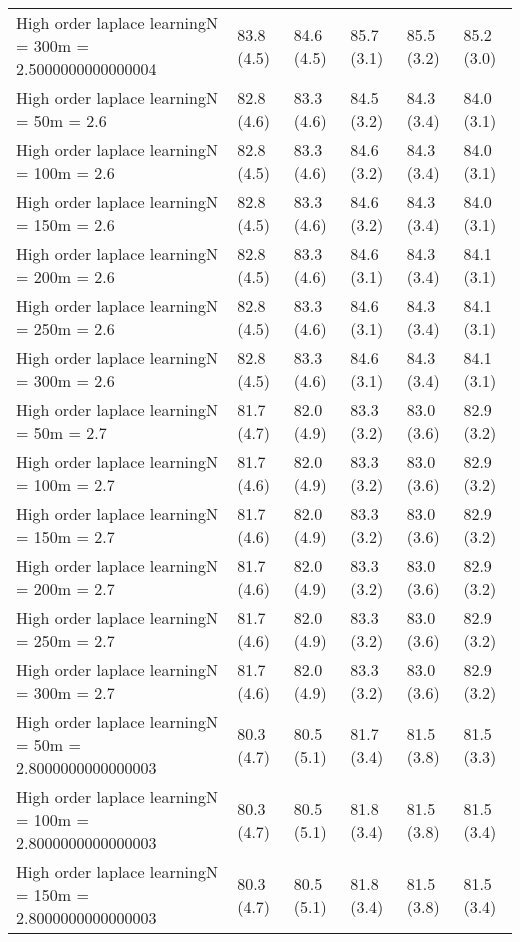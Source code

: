 \documentclass{article}
\begin{document}
\begin{table*}[t!]
\begin{center}
\begin{small}
\begin{sc}
\begin{tabular}{llllll}
High order laplace learningN = 300m = 2.5000000000000004&83.8 (4.5)      &84.6 (4.5)      &85.7 (3.1)      &85.5 (3.2)      &85.2 (3.0)      \\
High order laplace learningN = 50m = 2.6&82.8 (4.6)      &83.3 (4.6)      &84.5 (3.2)      &84.3 (3.4)      &84.0 (3.1)      \\
High order laplace learningN = 100m = 2.6&82.8 (4.5)      &83.3 (4.6)      &84.6 (3.2)      &84.3 (3.4)      &84.0 (3.1)      \\
High order laplace learningN = 150m = 2.6&82.8 (4.5)      &83.3 (4.6)      &84.6 (3.2)      &84.3 (3.4)      &84.0 (3.1)      \\
High order laplace learningN = 200m = 2.6&82.8 (4.5)      &83.3 (4.6)      &84.6 (3.1)      &84.3 (3.4)      &84.1 (3.1)      \\
High order laplace learningN = 250m = 2.6&82.8 (4.5)      &83.3 (4.6)      &84.6 (3.1)      &84.3 (3.4)      &84.1 (3.1)      \\
High order laplace learningN = 300m = 2.6&82.8 (4.5)      &83.3 (4.6)      &84.6 (3.1)      &84.3 (3.4)      &84.1 (3.1)      \\
High order laplace learningN = 50m = 2.7&81.7 (4.7)      &82.0 (4.9)      &83.3 (3.2)      &83.0 (3.6)      &82.9 (3.2)      \\
High order laplace learningN = 100m = 2.7&81.7 (4.6)      &82.0 (4.9)      &83.3 (3.2)      &83.0 (3.6)      &82.9 (3.2)      \\
High order laplace learningN = 150m = 2.7&81.7 (4.6)      &82.0 (4.9)      &83.3 (3.2)      &83.0 (3.6)      &82.9 (3.2)      \\
High order laplace learningN = 200m = 2.7&81.7 (4.6)      &82.0 (4.9)      &83.3 (3.2)      &83.0 (3.6)      &82.9 (3.2)      \\
High order laplace learningN = 250m = 2.7&81.7 (4.6)      &82.0 (4.9)      &83.3 (3.2)      &83.0 (3.6)      &82.9 (3.2)      \\
High order laplace learningN = 300m = 2.7&81.7 (4.6)      &82.0 (4.9)      &83.3 (3.2)      &83.0 (3.6)      &82.9 (3.2)      \\
High order laplace learningN = 50m = 2.8000000000000003&80.3 (4.7)      &80.5 (5.1)      &81.7 (3.4)      &81.5 (3.8)      &81.5 (3.3)      \\
High order laplace learningN = 100m = 2.8000000000000003&80.3 (4.7)      &80.5 (5.1)      &81.8 (3.4)      &81.5 (3.8)      &81.5 (3.4)      \\
High order laplace learningN = 150m = 2.8000000000000003&80.3 (4.7)      &80.5 (5.1)      &81.8 (3.4)      &81.5 (3.8)      &81.5 (3.4)      \\

\end{tabular}
\end{sc}
\end{small}
\end{center}
\end{table*}
\end{document}
